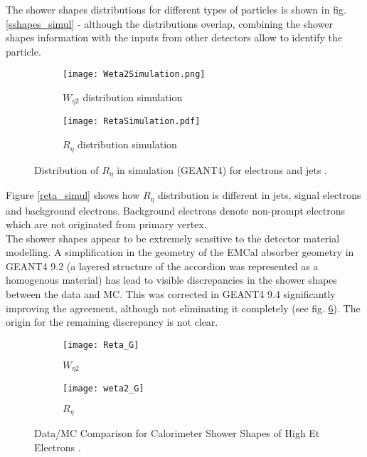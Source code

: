   The shower shapes distributions for different types of particles is shown in fig. \ref{sshapes_simul} - although the distributions overlap, combining the shower shapes information with the inputs from other detectors allow to identify the particle.  
    	\begin{figure}[htbp]
	\begin{subfigure}[t]{0.4\textwidth}
		\texttt{[image: Weta2Simulation.png]}
		\caption[ $W_{\eta 2}$]{$W_{\eta 2}$ distribution simulation}
		\label{fig::weta2_simul}
	\end{subfigure}
	\hfill
	\begin{subfigure}[t]{0.39\textwidth} 
		\texttt{[image: RetaSimulation.pdf]}
		\caption[ $R_{\eta}$]{$R_{\eta}$ distribution simulation}
		\label{fig::reta_simul}
	\end{subfigure}
  	\caption{Distribution of $R_{\eta}$ in simulation (GEANT4) for electrons and jets \cite{sshapes_simulation}.}
	\label{fig::sshapes_simul}
\end{figure}

  Figure \ref{reta_simul} shows how $R_{\eta}$ distribution is different in jets, signal electrons and background electrons. Background electrons denote non-prompt electrons which are not originated from primary vertex. \\
 
   The shower shapes appear to be extremely sensitive to the detector material modelling. A simplification in the geometry of the EMCal absorber geometry in GEANT4 9.2 (a layered structure of the accordion was represented as a homogenous material) has lead to visible discrepancies in the shower shapes between the data and MC. This was corrected in GEANT4 9.4 significantly improving the agreement, although not eliminating it completely (see fig. \ref{fig::sshapes_geant}).  The origin for the remaining discrepancy is not clear.\\
      	\begin{figure}[htbp]
  	\begin{subfigure}[t]{0.4\textwidth}
  		\texttt{[image: Reta\_G]}
  		\caption[ $W_{\eta 2}$]{$W_{\eta 2}$}
  		\label{fig::weta2_geant}
  	\end{subfigure}
  	\hfill
  	\begin{subfigure}[t]{0.4\textwidth} 
  		\texttt{[image: weta2\_G]}
  		\caption[ $R_{\eta}$]{$R_{\eta}$ }
  		\label{fig::reta_geant}
  	\end{subfigure}
  	\caption{Data/MC Comparison for Calorimeter Shower Shapes of High Et Electrons \cite{geant_corr}.}
  	\label{fig::sshapes_geant}
  \end{figure}
  
